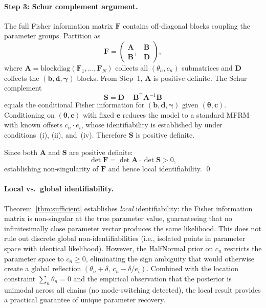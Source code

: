 \paragraph{Step 3: Schur complement argument.} The full Fisher information matrix $\mathbf{F}$ contains off-diagonal blocks coupling the parameter groups. Partition as
%
\begin{equation*}
\mathbf{F} = \begin{pmatrix} \mathbf{A} & \mathbf{B} \\ \mathbf{B}^\top & \mathbf{D} \end{pmatrix},
\end{equation*}
%
where $\mathbf{A} = \mathrm{blockdiag}(\mathbf{F}_1, \ldots, \mathbf{F}_N)$ collects all $(\theta_n, c_n)$ submatrices and $\mathbf{D}$ collects the $(\mathbf{b}, \mathbf{d}, \boldsymbol{\gamma})$ blocks. From Step~1, $\mathbf{A}$ is positive definite. The Schur complement
%
\begin{equation}
\label{eq:schur}
\mathbf{S} = \mathbf{D} - \mathbf{B}^\top \mathbf{A}^{-1} \mathbf{B}
\end{equation}
%
equals the conditional Fisher information for $(\mathbf{b}, \mathbf{d}, \boldsymbol{\gamma})$ given $(\boldsymbol{\theta}, \mathbf{c})$. Conditioning on $(\boldsymbol{\theta}, \mathbf{c})$ with fixed $\mathbf{e}$ reduces the model to a standard MFRM with known offsets $c_n \cdot e_i$, whose identifiability is established by \citet[Chapter~5]{sanmartin2016} under conditions~(i), (ii), and~(iv). Therefore $\mathbf{S}$ is positive definite.

Since both $\mathbf{A}$ and $\mathbf{S}$ are positive definite:
%
\begin{equation*}
\det \mathbf{F} = \det \mathbf{A} \cdot \det \mathbf{S} > 0,
\end{equation*}
%
establishing non-singularity of $\mathbf{F}$ and hence local identifiability. \qed

\paragraph{Local vs.\ global identifiability.} Theorem~\ref{thm:sufficient} establishes \emph{local} identifiability: the Fisher information matrix is non-singular at the true parameter value, guaranteeing that no infinitesimally close parameter vector produces the same likelihood. This does not rule out discrete global non-identifiabilities (i.e., isolated points in parameter space with identical likelihood). However, the HalfNormal prior on $c_n$ restricts the parameter space to $c_n \geq 0$, eliminating the sign ambiguity that would otherwise create a global reflection $(\theta_n + \delta,\, c_n - \delta/e_i)$. Combined with the location constraint $\sum_n \theta_n = 0$ and the empirical observation that the posterior is unimodal across all chains (no mode-switching detected), the local result provides a practical guarantee of unique parameter recovery.

